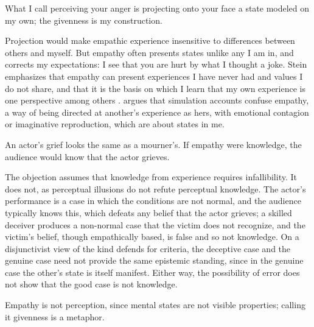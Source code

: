 \documentclass{situationist-preprint}
\begin{document}
\begin{objection}[Projection]\label{o:proj}
What I call perceiving your anger is projecting onto your face a state modeled on my own; the givenness is my construction.
\end{objection}

\begin{reply}
Projection would make empathic experience insensitive to differences between others and myself. But empathy often presents states unlike any I am in, and corrects my expectations: I see that you are hurt by what I thought a joke. Stein emphasizes that empathy can present experiences I have never had and values I do not share, and that it is the basis on which I learn that my own experience is one perspective among others \citep[ch.~3]{Stein1917}. \citet{Zahavi2014} argues that simulation accounts confuse empathy, a way of being directed at another's experience as hers, with emotional contagion or imaginative reproduction, which are about states in me.
\end{reply}

\begin{objection}\label{o:act}
An actor's grief looks the same as a mourner's. If empathy were knowledge, the audience would know that the actor grieves.
\end{objection}

\begin{reply}
The objection assumes that knowledge from experience requires infallibility. It does not, as perceptual illusions do not refute perceptual knowledge. The actor's performance is a case in which the conditions are not normal, and the audience typically knows this, which defeats any belief that the actor grieves; a skilled deceiver produces a non-normal case that the victim does not recognize, and the victim's belief, though empathically based, is false and so not knowledge. On a disjunctivist view of the kind \citet{McDowell1982} defends for criteria, the deceptive case and the genuine case need not provide the same epistemic standing, since in the genuine case the other's state is itself manifest. Either way, the possibility of error does not show that the good case is not knowledge.
\end{reply}

\begin{objection}\label{o:notperc}
Empathy is not perception, since mental states are not visible properties; calling it givenness is a metaphor.
\end{objection}
\end{document}
